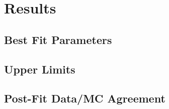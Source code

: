 \section{Results}

\subsection{Best Fit Parameters}

\subsection{Upper Limits}

\subsection{Post-Fit Data/MC Agreement}
